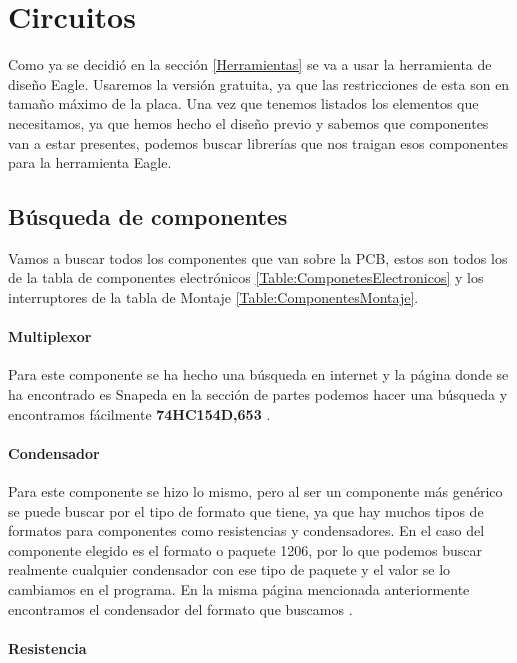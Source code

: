 \chapter{Circuitos}

Como ya se decidió en la sección \ref{Herramientas} se va a usar la herramienta de diseño Eagle.
Usaremos la versión gratuita, ya que las restricciones de esta son en tamaño máximo de la placa. Una vez que tenemos listados los elementos que necesitamos, ya que hemos hecho el diseño previo y sabemos que componentes van a estar presentes, podemos buscar librerías que nos traigan esos componentes para la herramienta Eagle.

\section{Búsqueda de componentes}

Vamos a buscar todos los componentes que van sobre la \gls{PCB}, estos son todos los de la tabla de componentes electrónicos \ref{Table:ComponetesElectronicos} y los interruptores de la tabla de Montaje \ref{Table:ComponentesMontaje}.

\subsubsection{\gls{Multiplexor}}

Para este componente se ha hecho una búsqueda en internet y la página donde se ha encontrado es Snapeda \cite{Snapeda} en la sección de partes podemos hacer una búsqueda y encontramos fácilmente \textbf{74HC154D,653} \cite{SnapedaMux}.

\subsubsection{Condensador}

Para este componente se hizo lo mismo, pero al ser un componente más genérico se puede buscar por el tipo de formato que tiene, ya que hay muchos tipos de formatos para componentes como resistencias y condensadores. En el caso del componente elegido es el formato o paquete 1206, por lo que podemos buscar realmente cualquier condensador con ese tipo de paquete y el valor se lo cambiamos en el programa. En la misma página mencionada anteriormente encontramos el condensador del formato que buscamos \cite{SnapedaCap}.

\subsubsection{Resistencia}

